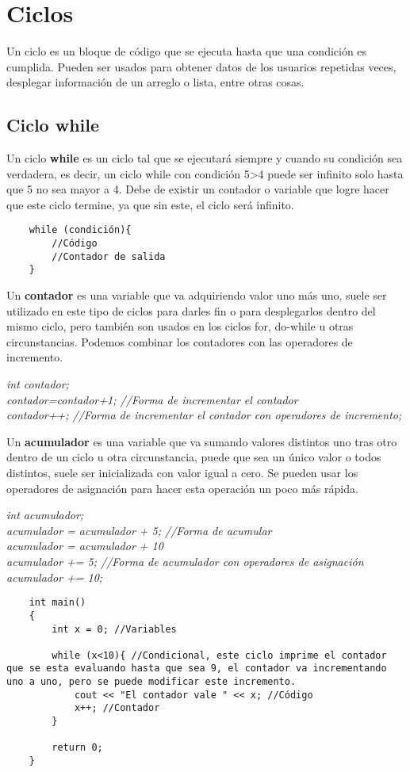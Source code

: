 \section{Ciclos}
Un ciclo es un bloque de código que se ejecuta hasta que una condición es cumplida. Pueden ser usados para obtener datos de los usuarios repetidas veces, desplegar información de un arreglo o lista, entre otras cosas.

\subsection{Ciclo while}
Un ciclo \textbf{while} es un ciclo tal que se ejecutará siempre y cuando su condición sea verdadera, es decir, un ciclo while con condición 5\textgreater 4 puede ser infinito solo hasta que 5 no sea mayor a 4. Debe de existir un contador o variable que logre hacer que este ciclo termine, ya que sin este, el ciclo será infinito.
\begin{lstlisting}
    while (condición){
        //Código
        //Contador de salida
    }
\end{lstlisting}
Un \textbf{contador} es una variable que va adquiriendo valor uno más uno, suele ser utilizado en este tipo de ciclos para darles fin o para desplegarlos dentro del mismo ciclo, pero también son usados en los ciclos for, do-while u otras circunstancias. Podemos combinar los contadores con las operadores de incremento.\begin{center}\textit{int contador;\\contador=contador+1; //Forma de incrementar el contador\\contador++; //Forma de incrementar el contador con operadores de incremento;}\end{center}
Un \textbf{acumulador} es una variable que va sumando valores distintos uno tras otro dentro de un ciclo u otra circunstancia, puede que sea un único valor o todos distintos, suele ser inicializada con valor igual a cero. Se pueden usar los operadores de asignación para hacer esta operación un poco más rápida.\begin{center}\textit{int acumulador;\\acumulador = acumulador + 5; //Forma de acumular\\acumulador = acumulador + 10\\acumulador += 5; //Forma de acumulador con operadores de asignación\\acumulador += 10;}\end{center}
\begin{lstlisting}
    int main()
    {
        int x = 0; //Variables
        
        while (x<10){ //Condicional, este ciclo imprime el contador que se esta evaluando hasta que sea 9, el contador va incrementando uno a uno, pero se puede modificar este incremento.
            cout << "El contador vale " << x; //Código
            x++; //Contador
        }
        
        return 0;
    }
\end{lstlisting}

